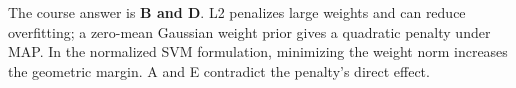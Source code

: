 The course answer is \textbf{B and D}. L2 penalizes large weights and can reduce overfitting; a zero-mean Gaussian weight prior gives a quadratic penalty under MAP. In the normalized SVM formulation, minimizing the weight norm increases the geometric margin. A and E contradict the penalty's direct effect.
